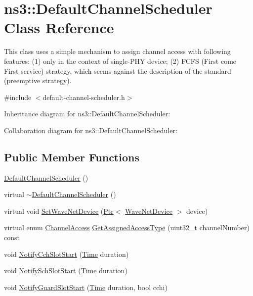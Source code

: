 \hypertarget{classns3_1_1DefaultChannelScheduler}{}\section{ns3\+:\+:Default\+Channel\+Scheduler Class Reference}
\label{classns3_1_1DefaultChannelScheduler}


This class uses a simple mechanism to assign channel access with following features\+: (1) only in the context of single-\/\+P\+HY device; (2) F\+C\+FS (First come First service) strategy, which seems against the description of the standard (preemptive strategy).  




{\ttfamily \#include $<$default-\/channel-\/scheduler.\+h$>$}



Inheritance diagram for ns3\+:\+:Default\+Channel\+Scheduler\+:


Collaboration diagram for ns3\+:\+:Default\+Channel\+Scheduler\+:
\subsection*{Public Member Functions}
\begin{DoxyCompactItemize}
\item 
\hyperlink{classns3_1_1DefaultChannelScheduler_a2f4a99be858c2476c0569a65a3f59bef}{Default\+Channel\+Scheduler} ()
\item 
virtual \hyperlink{classns3_1_1DefaultChannelScheduler_a8574cc91a94596a37b3b475581b41ced}{$\sim$\+Default\+Channel\+Scheduler} ()
\item 
virtual void \hyperlink{classns3_1_1DefaultChannelScheduler_afb5ca3b14de96cef538ea60cd0e21cf5}{Set\+Wave\+Net\+Device} (\hyperlink{classns3_1_1Ptr}{Ptr}$<$ \hyperlink{classns3_1_1WaveNetDevice}{Wave\+Net\+Device} $>$ device)
\item 
virtual enum \hyperlink{namespacens3_a877f2f8d3767cc34993bce0739179781}{Channel\+Access} \hyperlink{classns3_1_1DefaultChannelScheduler_a6f6064543c8a5083807b1b077525efe5}{Get\+Assigned\+Access\+Type} (uint32\+\_\+t channel\+Number) const 
\item 
void \hyperlink{classns3_1_1DefaultChannelScheduler_a602f8a64f1de3847cdf562b01527f905}{Notify\+Cch\+Slot\+Start} (\hyperlink{classns3_1_1Time}{Time} duration)
\item 
void \hyperlink{classns3_1_1DefaultChannelScheduler_ac29f4753c557ac3bf40efdbb03d58f1f}{Notify\+Sch\+Slot\+Start} (\hyperlink{classns3_1_1Time}{Time} duration)
\item 
void \hyperlink{classns3_1_1DefaultChannelScheduler_a4a5636f25d5a17387bc5b40a094fb92e}{Notify\+Guard\+Slot\+Start} (\hyperlink{classns3_1_1Time}{Time} duration, bool cchi)
\end{DoxyCompactItemize}
